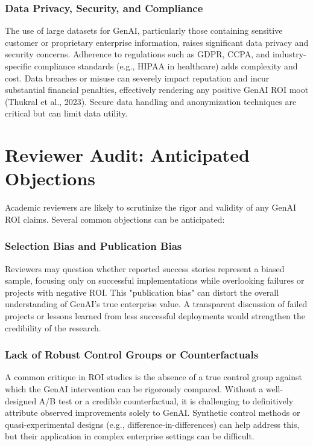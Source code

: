 \documentclass[10pt,twocolumn,letterpaper]{article}
\begin{document}
\subsubsection{Data Privacy, Security, and Compliance}

The use of large datasets for GenAI, particularly those containing sensitive customer or proprietary enterprise information, raises significant data privacy and security concerns. Adherence to regulations such as GDPR, CCPA, and industry-specific compliance standards (e.g., HIPAA in healthcare) adds complexity and cost. Data breaches or misuse can severely impact reputation and incur substantial financial penalties, effectively rendering any positive GenAI ROI moot (Thukral et al., 2023). Secure data handling and anonymization techniques are critical but can limit data utility.


\section{Reviewer Audit: Anticipated Objections}


Academic reviewers are likely to scrutinize the rigor and validity of any GenAI ROI claims. Several common objections can be anticipated:


\subsubsection{Selection Bias and Publication Bias}

Reviewers may question whether reported success stories represent a biased sample, focusing only on successful implementations while overlooking failures or projects with negative ROI. This "publication bias" can distort the overall understanding of GenAI's true enterprise value. A transparent discussion of failed projects or lessons learned from less successful deployments would strengthen the credibility of the research.


\subsubsection{Lack of Robust Control Groups or Counterfactuals}

A common critique in ROI studies is the absence of a true control group against which the GenAI intervention can be rigorously compared. Without a well-designed A/B test or a credible counterfactual, it is challenging to definitively attribute observed improvements solely to GenAI. Synthetic control methods or quasi-experimental designs (e.g., difference-in-differences) can help address this, but their application in complex enterprise settings can be difficult.
\end{document}
